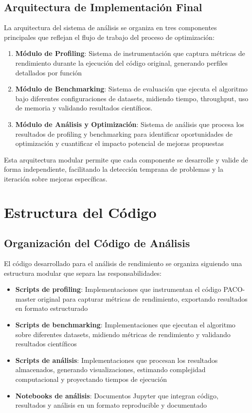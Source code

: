 \subsection{Arquitectura de Implementación Final}

La arquitectura del sistema de análisis se organiza en tres componentes principales que reflejan el flujo de trabajo del proceso de optimización:

\begin{enumerate}
    \item \textbf{Módulo de Profiling}: Sistema de instrumentación que captura métricas de rendimiento durante la ejecución del código original, generando perfiles detallados por función
    \item \textbf{Módulo de Benchmarking}: Sistema de evaluación que ejecuta el algoritmo bajo diferentes configuraciones de datasets, midiendo tiempo, throughput, uso de memoria y validando resultados científicos.
    \item \textbf{Módulo de Análisis y Optimización}: Sistema de análisis que procesa los resultados de profiling y benchmarking para identificar oportunidades de optimización y cuantificar el impacto potencial de mejoras propuestas
\end{enumerate}

Esta arquitectura modular permite que cada componente se desarrolle y valide de forma independiente, facilitando la detección temprana de problemas y la iteración sobre mejoras específicas.

\section{Estructura del Código}

\subsection{Organización del Código de Análisis}

El código desarrollado para el análisis de rendimiento se organiza siguiendo una estructura modular que separa las responsabilidades:

\begin{itemize}
    \item \textbf{Scripts de profiling}: Implementaciones que instrumentan el código PACO-master original para capturar métricas de rendimiento, exportando resultados en formato estructurado
    \item \textbf{Scripts de benchmarking}: Implementaciones que ejecutan el algoritmo sobre diferentes datasets, midiendo métricas de rendimiento y validando resultados científicos
    \item \textbf{Scripts de análisis}: Implementaciones que procesan los resultados almacenados, generando visualizaciones, estimando complejidad computacional y proyectando tiempos de ejecución
    \item \textbf{Notebooks de análisis}: Documentos Jupyter que integran código, resultados y análisis en un formato reproducible y documentado
\end{itemize}

